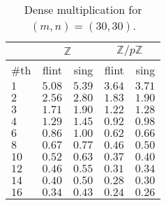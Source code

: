 \documentclass{deliverablereport}
\begin{document}
\begin{table}[htb]
\begin{tabular}{l | r | r | r | r | }
& \multicolumn{2}{|c|}{$\mathbb{Z}$} & \multicolumn{2}{|c|}{$\mathbb{Z}/p \mathbb{Z}$} \\ \hline
\#th   & flint & sing & flint & sing\\ \hline
$1$   & $5.08$ & $5.39$ &$3.64$ & $3.71$\\ \hline
$2$   & $2.56$ & $2.80$ &$1.83$ & $1.90$\\ \hline
$3$   & $1.71$ & $1.90$ &$1.22$ & $1.28$\\ \hline
$4$   & $1.29$ & $1.45$ &$0.92$ & $0.98$\\ \hline
$6$   & $0.86$ & $1.00$ &$0.62$ & $0.66$\\ \hline
$8$   & $0.67$ & $0.77$ &$0.46$ & $0.50$\\ \hline
$10$  & $0.52$ & $0.63$ &$0.37$ & $0.40$\\ \hline
$12$  & $0.46$ & $0.55$ &$0.31$ & $0.34$\\ \hline
$14$  & $0.40$ & $0.50$ &$0.28$ & $0.30$\\ \hline
$16$  & $0.34$ & $0.43$ &$0.24$ & $0.26$\\ \hline
\end{tabular}
\caption{Dense multiplication for $(m, n) = (30, 30)$.}
\label{table_dense_mul}
\end{table}
\end{document}
